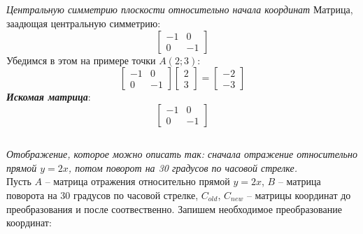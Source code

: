 \documentclass[a5paper, 10pt]{article}
\theoremstyle{definition}
\theoremstyle{plain}
\theoremstyle{remark}
\begin{document}
\subsection{}
\textit{Центральную симметрию плоскости относительно начала координат}
Матрица, заадющая центральную симметрию:
\begin{equation}
\begin{bmatrix}
-1 & 0\\
0 & -1
\end{bmatrix}
\end{equation}
Убедимся в этом на примере точки $A(2; 3)$:
\begin{equation}
\begin{bmatrix}
-1 & 0\\
0 & -1
\end{bmatrix}
\begin{bmatrix}
2\\
3
\end{bmatrix}
=
\begin{bmatrix}
-2\\
-3
\end{bmatrix}
\end{equation}
\textit{\textbf{Искомая матрица}}:
\begin{equation}
\begin{bmatrix}
-1 & 0\\
0 & -1
\end{bmatrix}
\end{equation}

\newpage
\subsection{}
\textit{Отображение, которое можно описать так: сначала отражение относительно прямой $y=2x$, потом поворот на 30 градусов по часовой стрелке.}
\\Пусть $A$ -- матрица отражения относительно прямой  $y=2x$, $B$ -- матрица поворота на 30 градусов по часовой стрелке, $C_{old}$, $C_{new}$ -- матрицы координат до преобразования и после соотвественно. Запишем необходимое преобразование координат:
\end{document}
